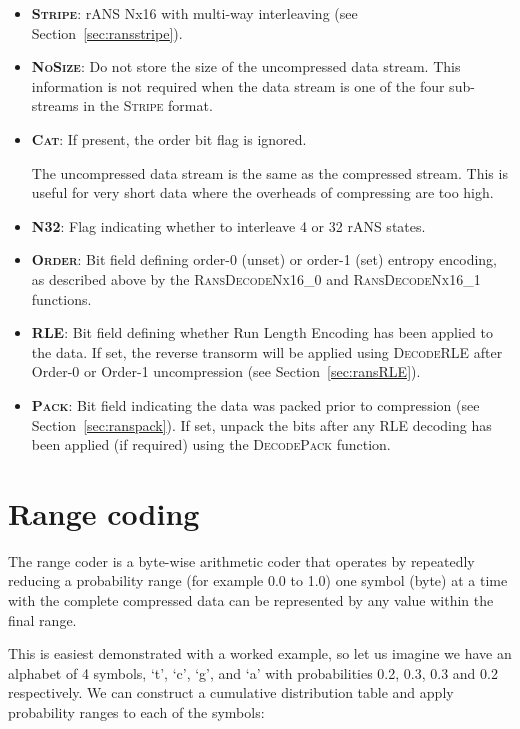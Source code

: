 \documentclass[a4paper]{article}
\begin{document}
\begin{itemize}
\item{\textbf{\textsc{Stripe}}:}
rANS Nx16 with multi-way interleaving (see Section~\ref{sec:ransstripe}).

\item{\textbf{\textsc{NoSize}}:}
Do not store the size of the uncompressed data stream.
This information is not required when the data stream is one of the four sub-streams in the \textsc{Stripe} format.

\item{\textbf{\textsc{Cat}}:}
If present, the order bit flag is ignored.

The uncompressed data stream is the same as the compressed stream.
This is useful for very short data where the overheads of compressing are too high.

\item{\textbf{\textsc{N32}}:}
Flag indicating whether to interleave 4 or 32 rANS states.

\item{\textbf{\textsc{Order}}:}
Bit field defining order-0 (unset) or order-1 (set) entropy encoding, as described above by the \textsc{RansDecodeNx16\_0} and \textsc{RansDecodeNx16\_1} functions.

\item{\textbf{\textsc{RLE}}:}
Bit field defining whether Run Length Encoding has been applied to the data.  If set, the reverse transorm will be applied using \textsc{DecodeRLE} after Order-0 or Order-1 uncompression (see Section~\ref{sec:ransRLE}).

\item{\textbf{\textsc{Pack}}:}
Bit field indicating the data was packed prior to compression (see Section~\ref{sec:ranspack}).  If set, unpack the bits after any RLE decoding has been applied (if required) using the \textsc{DecodePack} function.

\end{itemize}

\section{Range coding}

The range coder is a byte-wise arithmetic coder that operates by
repeatedly reducing a probability range (for example 0.0 to 1.0) one
symbol (byte) at a time with the complete compressed data can be
represented by any value within the final range.

This is easiest demonstrated with a worked example, so let us imagine
we have an alphabet of 4 symbols, `t', `c', `g', and `a' with
probabilities 0.2, 0.3, 0.3 and 0.2 respectively.  We can construct a
cumulative distribution table and apply probability ranges to each of
the symbols:
\end{document}
